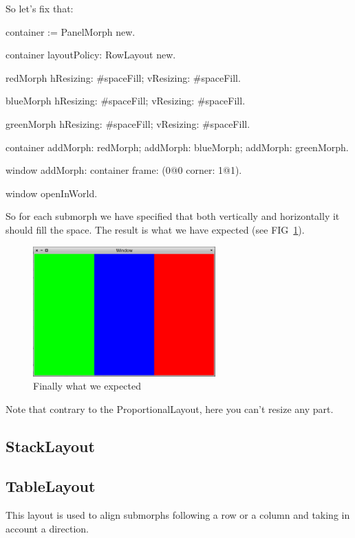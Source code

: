 \documentclass[a4paper,10pt,twoside]{book}
\begin{document}
So let's fix that:
\begin{code}{}
container := PanelMorph new.

container layoutPolicy: RowLayout new.

redMorph
	hResizing: #spaceFill;
	vResizing: #spaceFill.

blueMorph
	hResizing: #spaceFill;
	vResizing: #spaceFill.
	
greenMorph
	hResizing: #spaceFill;
	vResizing: #spaceFill.

container 
	addMorph: redMorph;
	addMorph: blueMorph;
	addMorph: greenMorph.

window
	addMorph: container
	frame: (0@0 corner: 1@1).

window openInWorld.
\end{code}

So for each submorph we have specified that both vertically and horizontally it should fill the space.
The result is what we have expected (see FIG~\ref{fig:rowLayout3}).

\begin{figure}[ht]\centering
	\includegraphics[width=7cm]{RowLayout3}
	\caption{Finally what we expected}
	\label{fig:rowLayout3}
\end{figure}

Note that contrary to the ProportionalLayout, here you can't resize any part.

\subsection{StackLayout}


\subsection{TableLayout}

This layout is used to align submorphs following a row or a column and taking in account a direction.
\end{document}

